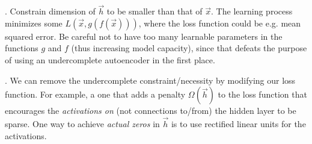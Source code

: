 \documentclass[11pt]{article}
\begin{document}
\myspace
\p {}. Constrain dimension of $\vec{h}$ to be smaller than that of $\vec{x}$. The learning process minimizes some $L(\vec{x}, g(f(\vec{x})))$, where the loss function could be e.g. mean squared error. Be careful not to have too many learnable parameters in the functions $g$ and $f$ (thus increasing model capacity), since that defeats the purpose of using an undercomplete autoencoder in the first place.

\myspace
\p {}. We can remove the undercomplete constraint/necessity by modifying our loss function. For example, a  one that adds a penalty $\Omega(\vec{h})$ to the loss function that encourages the \textit{activations on} (not connections to/from) the hidden layer to be sparse. One way to achieve \textit{actual zeros} in $\vec{h}$ is to use rectified linear units for the activations.


%
% 
\end{document}
